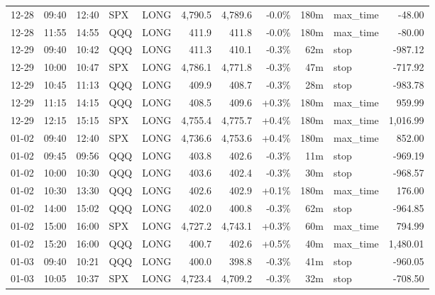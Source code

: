 \documentclass[11pt,a4paper,twoside]{article}
\begin{document}
\begin{center}
\begin{longtable}{>{\color{txtmain}}l l l l l r r r r >{\color{txtmain}}l r}
12-28 & 09:40 & 12:40 & SPX & LONG & 4,790.5 & 4,789.6 & \textcolor{lossred}{-0.0\%} & 180m & max\_time & \textcolor{lossred}{-48.00} \\
12-28 & 11:55 & 14:55 & QQQ & LONG & 411.9 & 411.8 & \textcolor{lossred}{-0.0\%} & 180m & max\_time & \textcolor{lossred}{-80.00} \\
12-29 & 09:40 & 10:42 & QQQ & LONG & 411.3 & 410.1 & \textcolor{lossred}{-0.3\%} & 62m & stop & \textcolor{lossred}{-987.12} \\
12-29 & 10:00 & 10:47 & SPX & LONG & 4,786.1 & 4,771.8 & \textcolor{lossred}{-0.3\%} & 47m & stop & \textcolor{lossred}{-717.92} \\
12-29 & 10:45 & 11:13 & QQQ & LONG & 409.9 & 408.7 & \textcolor{lossred}{-0.3\%} & 28m & stop & \textcolor{lossred}{-983.78} \\
12-29 & 11:15 & 14:15 & QQQ & LONG & 408.5 & 409.6 & \textcolor{wingreen}{+0.3\%} & 180m & max\_time & \textcolor{wingreen}{959.99} \\
12-29 & 12:15 & 15:15 & SPX & LONG & 4,755.4 & 4,775.7 & \textcolor{wingreen}{+0.4\%} & 180m & max\_time & \textcolor{wingreen}{1,016.99} \\
01-02 & 09:40 & 12:40 & SPX & LONG & 4,736.6 & 4,753.6 & \textcolor{wingreen}{+0.4\%} & 180m & max\_time & \textcolor{wingreen}{852.00} \\
01-02 & 09:45 & 09:56 & QQQ & LONG & 403.8 & 402.6 & \textcolor{lossred}{-0.3\%} & 11m & stop & \textcolor{lossred}{-969.19} \\
01-02 & 10:00 & 10:30 & QQQ & LONG & 403.6 & 402.4 & \textcolor{lossred}{-0.3\%} & 30m & stop & \textcolor{lossred}{-968.57} \\
01-02 & 10:30 & 13:30 & QQQ & LONG & 402.6 & 402.9 & \textcolor{wingreen}{+0.1\%} & 180m & max\_time & \textcolor{wingreen}{176.00} \\
01-02 & 14:00 & 15:02 & QQQ & LONG & 402.0 & 400.8 & \textcolor{lossred}{-0.3\%} & 62m & stop & \textcolor{lossred}{-964.85} \\
01-02 & 15:00 & 16:00 & SPX & LONG & 4,727.2 & 4,743.1 & \textcolor{wingreen}{+0.3\%} & 60m & max\_time & \textcolor{wingreen}{794.99} \\
01-02 & 15:20 & 16:00 & QQQ & LONG & 400.7 & 402.6 & \textcolor{wingreen}{+0.5\%} & 40m & max\_time & \textcolor{wingreen}{1,480.01} \\
01-03 & 09:40 & 10:21 & QQQ & LONG & 400.0 & 398.8 & \textcolor{lossred}{-0.3\%} & 41m & stop & \textcolor{lossred}{-960.05} \\
01-03 & 10:05 & 10:37 & SPX & LONG & 4,723.4 & 4,709.2 & \textcolor{lossred}{-0.3\%} & 32m & stop & \textcolor{lossred}{-708.50} \\

\end{longtable}
\end{center}
\end{document}
